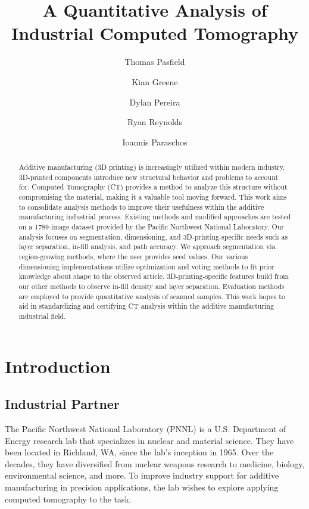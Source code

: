\documentclass[11pt, letterpaper]{article}
\title{A Quantitative Analysis of Industrial Computed Tomography}
\author {Thomas Pasfield}
\author{Kian Greene}
\author{Dylan Pereira}
\author{Ryan Reynolds}
\author{Ioannis Paraschos}
\affil{Embry-Riddle Aeronautical University, Daytona Beach, FL}
\begin{document}
\begin{titlingpage}
    \maketitle

    \vfill

    \begin{abstract}
        Additive manufacturing (3D printing) is increasingly utilized within modern industry. 3D-printed components introduce new structural behavior and problems to account for. Computed Tomography (CT) provides a method to analyze this structure without compromising the material, making it a valuable tool moving forward. This work aims to consolidate analysis methods to improve their usefulness within the additive manufacturing industrial process. Existing methods and modified approaches are tested on a 1789-image dataset provided by the Pacific Northwest National Laboratory. Our analysis focuses on segmentation, dimensioning, and 3D-printing-specific needs such as layer separation, in-fill analysis, and path accuracy. We approach segmentation via region-growing methods, where the user provides seed values. Our various dimensioning implementations utilize optimization and voting methods to fit prior knowledge about shape to the observed article. 3D-printing-specific features build from our other methods to observe in-fill density and layer separation. Evaluation methods are employed to provide quantitative analysis of scanned samples. This work hopes to aid in standardizing and certifying CT analysis within the additive manufacturing industrial field.
    \end{abstract}
\end{titlingpage}

\section{Introduction}
\subsection{Industrial Partner}
    The Pacific Northwest National Laboratory (PNNL) is a U.S. Department of Energy research lab that specializes in nuclear and material science. They have been located in Richland, WA, since the lab's inception in 1965. Over the decades, they have diversified from nuclear weapons research to medicine, biology, environmental science, and more.\cite{noauthor_national_nodate} To improve industry support for additive manufacturing in precision applications, the lab wishes to explore applying computed tomography to the task.
\end{document}
